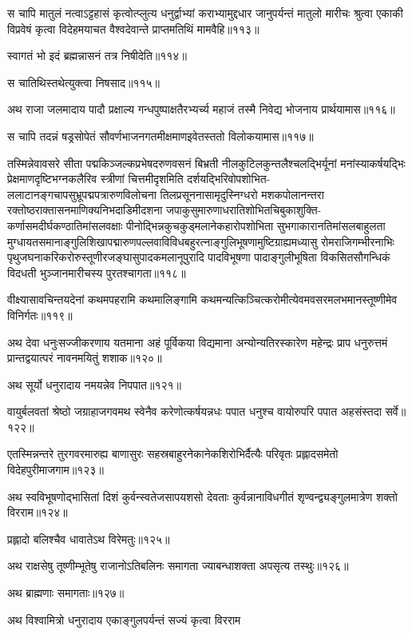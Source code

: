 \begin{flushleft}
स चापि मातुलं नत्वाऽट्टहासं कृत्वोत्प्लुत्य धनुर्द्वाभ्यां कराभ्यामुद्दधार जानुपर्यन्तं मातुलो मारीचः श्रुत्वा एकाकी विप्रवेषं कृत्वा विदेहमयाचत वैश्वदेवान्ते प्राप्तमतिथिं मामवैहि॥११३॥


स्वागतं भो इदं ब्रह्मन्नासनं तत्र निषीदेति॥११४॥

स चातिथिस्तथेत्युक्त्वा निषसाद॥११५॥

अथ राजा जलमादाय पादौ प्रक्षाल्य गन्धपुष्पाक्षतैरभ्यर्च्य महाजं तस्मै निवेद्य भोजनाय प्रार्थयामास॥११६॥

स चापि तदन्नं षड्रसोपेतं सौवर्णभाजनगतमीक्षमाणइवेतस्ततो विलोकयामास॥११७॥

तस्मिन्नेवावसरे सीता पद्मकिञ्जल्कप्रभेषदरुणवसनं बिभ्रती नीलकुटिलकुन्तलैश्चलद्भिर्यूनां मनांस्याकर्षयद्भिः प्रेक्षमाणदृष्टिभग्नकलैरिव स्त्रीणां चित्तमीदृशमिति दर्शयद्भिरिवोपशोभित-ललाटानङ्गचापसुभ्रूपद्मपत्रारुणविलोचना तिलप्रसूननासामृदुस्निग्धरो मशकपोलानन्तरा रक्तोष्ठराक्तासनमाणिक्यनिभदाडिमीदशना जपाकुसुमारुणाधरातिशोभितचिबुकाशुक्ति-कर्णासमदीर्घकण्ठातिमांसलवक्षाः पीनोद्भिन्नकुचकुड्मलानेकहारोपशोभिता सुभगाकारानतिमांसलबाहुलता मुग्धायतसमानाङ्गुलिशिखापद्मारुणपल्लवाविविधबहुरत्नाङ्गुलिभूषणामुष्टिग्राह्यमध्यासु रोमराजिगम्भीरनाभिः पृथुजघनाकरिकरोरुस्तूणीरजङ्घासुपादकमलानूपुरादि पादविभूषणा पादाङ्गुलीभूषिता विकसितसौगन्धिकं विदधती भुञ्जानमारीचस्य पुरतश्चागता॥११८॥

वीक्ष्यासावचिन्तयदेनां कथमपहरामि कथमालिङ्गामि कथमन्यत्किञ्चित्करोमीत्येवमवसरमलभमानस्तूष्णीमेव विनिर्गतः॥११९॥

अथ देवा धनुःसज्जीकरणाय यतमाना अहं पूर्विकया विद्यमाना अन्योन्यतिरस्कारेण महेन्द्रः प्राप धनुरुत्तमं प्रान्तद्वयात्परं नावनमयितुं शशाक॥१२०॥

अथ सूर्यो धनुरादाय नमयन्नेव निपपात॥१२१॥

वायुर्बलवतां श्रेष्ठो जग्राहाजगवमथ स्वेनैव करेणोत्कर्षयन्नधः पपात धनुश्च वायोरुपरि पपात अहसंस्तदा सर्वे॥१२२॥

एतस्मिन्नन्तरे तुरगवरमारुह्य बाणासुरः सहस्रबाहुरनेकानेकशिरोभिर्दैत्यैः परिवृतः प्रह्लादसमेतो विदेहपुरीमाजगाम॥१२३॥

अथ स्वविभूषणोद्भासितां दिशं कुर्वन्स्वतेजसापयशसो देवताः कुर्वन्नानाविधगीतं शृण्वन्द्व्यङ्गुलमात्रेण शक्तो विरराम॥१२४॥

प्रह्लादो बलिश्चैव धावातेऽथ विरेमतुः॥१२५॥

अथ राक्षसेषु तूष्णीम्भूतेषु राजानोऽतिबलिनः समागता ज्याबन्धाशक्ता अपसृत्य तस्थुः॥१२६॥

अथ ब्राह्मणाः समागताः॥१२७॥

अथ विश्वामित्रो धनुरादाय एकाङ्गुलपर्यन्तं सज्यं कृत्वा विरराम


\end{flushleft}
